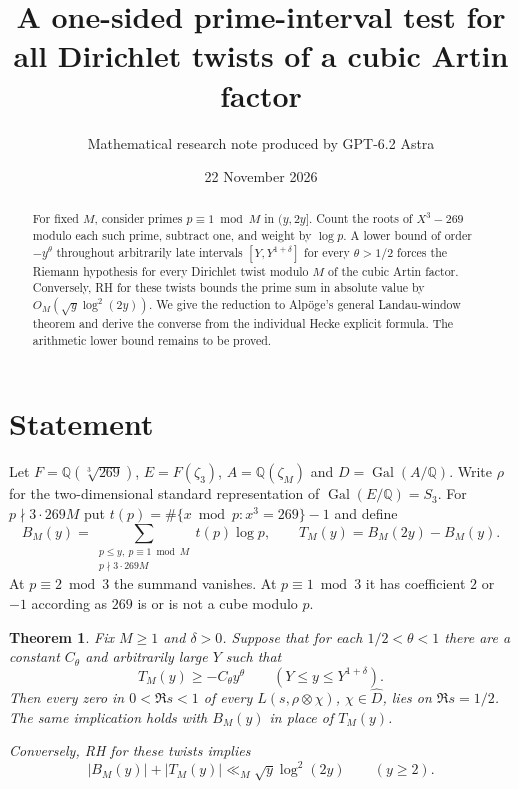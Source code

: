 \documentclass[11pt]{article}
\title{A one-sided prime-interval test for all Dirichlet twists of a cubic Artin factor}
\author{Mathematical research note produced by GPT-6.2 Astra}
\date{22 November 2026}
\newtheorem{theorem}{Theorem}
\begin{document}
\maketitle
\begin{abstract}
For fixed $M$, consider primes $p\equiv1\bmod M$ in $(y,2y]$.
Count the roots of $X^3-269$ modulo each such prime, subtract one,
and weight by $\log p$. A lower bound of order $-y^\theta$ throughout
arbitrarily late intervals $[Y,Y^{1+\delta}]$ for every
$\theta>1/2$ forces the Riemann hypothesis for every Dirichlet twist
modulo $M$ of the cubic Artin factor. Conversely, RH for these twists
bounds the prime sum in absolute value by $O_M(\sqrt y\log^2(2y))$.
We give the reduction to Alp\"oge's general Landau-window theorem and
derive the converse from the individual Hecke explicit formula. The arithmetic lower bound
remains to be proved.
\end{abstract}

\section*{Statement}
Let $F=\mathbb Q(\sqrt[3]{269})$, $E=F(\zeta_3)$, $A=\mathbb Q(\zeta_M)$
and $D=\operatorname{Gal}(A/\mathbb Q)$. Write $\rho$ for the
two-dimensional standard representation of $\operatorname{Gal}(E/\mathbb Q)=S_3$.
For $p\nmid3\cdot269M$ put $t(p)=\#\{x\bmod p:x^3=269\}-1$ and define
\[
 B_M(y)=\sum_{\substack{p\le y,\ p\equiv1\bmod M\\p\nmid3\cdot269M}}
              t(p)\log p,\qquad T_M(y)=B_M(2y)-B_M(y).
\]
At $p\equiv2\bmod3$ the summand vanishes. At $p\equiv1\bmod3$ it has
coefficient $2$ or $-1$ according as $269$ is or is not a cube modulo $p$.

\begin{theorem}
Fix $M\ge1$ and $\delta>0$. Suppose that for each $1/2<\theta<1$
there are a constant $C_\theta$ and arbitrarily large $Y$ such that
\[
 T_M(y)\ge-C_\theta y^\theta \qquad(Y\le y\le Y^{1+\delta}).        \tag{1}
\]
Then every zero in $0<\Re s<1$ of every $L(s,\rho\otimes\chi)$,
$\chi\in\widehat D$, lies on $\Re s=1/2$. The same implication
holds with $B_M(y)$ in place of $T_M(y)$.

Conversely, RH for these twists implies
\[
   |B_M(y)|+|T_M(y)|\ll_M\sqrt y\log^2(2y)\qquad(y\ge2).
\]
\end{theorem}
\end{document}
